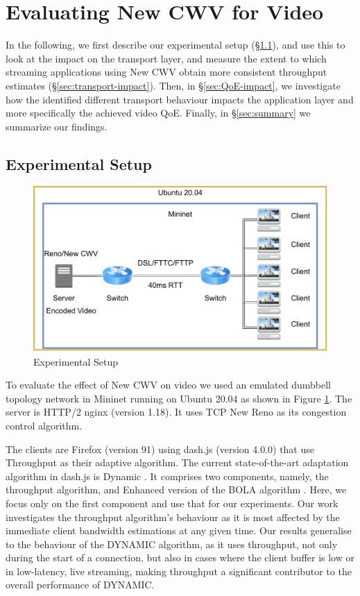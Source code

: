 \documentclass[10pt,sigconf,anonymous]{acmart}
\begin{document}

\section{Evaluating New CWV for Video}
\label{sec:evaluation}

In the following, we first describe our experimental setup (§\ref{sec:experimental-setup}), and use this to look at the impact on the transport layer, and measure the extent to which streaming applications using New CWV obtain more consistent throughput estimates (§\ref{sec:transport-impact}). Then, in §\ref{sec:QoE-impact}, we investigate how the identified different transport behaviour impacts the application layer and more specifically the achieved video QoE. Finally, in §\ref{sec:summary} we summarize our findings.


\subsection{Experimental Setup}
\label{sec:experimental-setup}

\begin{figure}
  \centering
  \includegraphics[width=.5\textwidth]{figures/setup.pdf}
  \caption{Experimental Setup}
  \label{fig:experimental-setup}
\end{figure}

To evaluate the effect of New CWV on video we used an emulated dumbbell topology network in Mininet running on Ubuntu 20.04 as shown in Figure \ref{fig:experimental-setup}.
 The server is HTTP/2 nginx (version 1.18). It uses TCP New Reno as its congestion control algorithm.

 The clients are Firefox (version 91) using dash.js (version 4.0.0) that use Throughput as their adaptive algorithm. The current state-of-the-art adaptation algorithm in dash.js is Dynamic \cite{Spiteri-2019-from-theory-to-practice-sabre}. It comprises two components, namely, the throughput algorithm, and Enhanced version of the BOLA algorithm \cite{Spiteri-2016-BOLA}. Here, we focus only on the first component and use that for our experiments. Our work investigates the throughput algorithm's behaviour as it is most affected by the immediate client bandwidth estimations at any given time. Our results generalise to the behaviour of the DYNAMIC algorithm, as it uses throughput, not only during the start of a connection, but also in cases where the client buffer is low or in low-latency, live streaming, making throughput a significant contributor to the overall performance of DYNAMIC.
\end{document}
